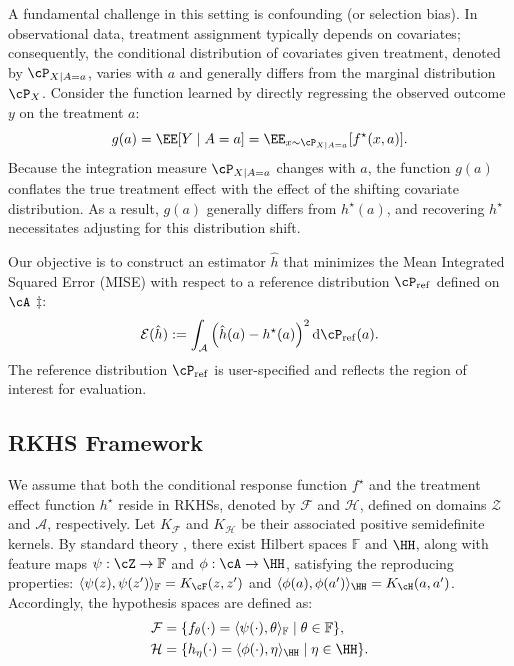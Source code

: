 \documentclass[english,11pt]{article}
\newcommand{\FF}{\mathbb{F}}
\begin{document}
A fundamental challenge in this setting is confounding (or selection bias). In observational data, treatment assignment typically depends on covariates; consequently, the conditional distribution of covariates given treatment, denoted by $\cP_{X|A=a}$, varies with $a$ and generally differs from the marginal distribution $\cP_X$.
Consider the function learned by directly regressing the observed outcome $y$ on the treatment $a$:
\begin{equation*}
g(a) = \EE [Y \mid A=a] = \EE_{x \sim \cP_{X|A=a}} [f^\star(x, a)].
\end{equation*}
Because the integration measure $\cP_{X|A=a}$ changes with $a$, the function $g(a)$ conflates the true treatment effect with the effect of the shifting covariate distribution. As a result, $g(a)$ generally differs from $h^\star(a)$, and recovering $h^\star$ necessitates adjusting for this distribution shift.

Our objective is to construct an estimator $\hat{h}$ that minimizes the Mean Integrated Squared Error (MISE) with respect to a reference distribution $\cP_{\operatorname{ref}}$ defined on $\cA$ \(\ddag\):
\begin{equation}\label{eq:mise}
    \mathcal{E}(\hat{h}) := \int_{\mathcal{A}} \left( \hat{h}(a) - h^\star(a) \right)^2 \mathrm{d}\cP_{\operatorname{ref}}(a).
\end{equation}
The reference distribution $\cP_{\operatorname{ref}}$ is user-specified and reflects the region of interest for evaluation.

\subsection{RKHS Framework}

We assume that both the conditional response function $f^\star$ and the treatment effect function $h^\star$ reside in RKHSs, denoted by $\mathcal{F}$ and $\mathcal{H}$, defined on domains $\mathcal{Z}$ and $\mathcal{A}$, respectively.
Let $K_{\mathcal{F}}$ and $K_{\mathcal{H}}$ be their associated positive semidefinite kernels.
By standard theory \citep{aronszajn1950theory}, there exist Hilbert spaces \(\FF\) and \(\HH\), along with feature maps $\psi: \cZ \to \FF$ and $\phi: \cA \to \HH$, satisfying the reproducing properties: \(\langle \psi(z), \psi(z')\rangle_{\FF} = K_\cF(z,z')\) and \(\langle \phi(a), \phi(a')\rangle_{\HH} = K_\cH(a,a')\).
Accordingly, the hypothesis spaces are defined as:
\begin{align*}
    \mathcal{F} &= \{ f_\theta(\cdot) = \langle \psi(\cdot), \theta \rangle_{\FF} \mid \theta \in \FF \}, \\
    \mathcal{H} &= \{ h_\eta(\cdot) = \langle \phi(\cdot), \eta \rangle_{\HH} \mid \eta \in \HH \}.
\end{align*}
\end{document}
